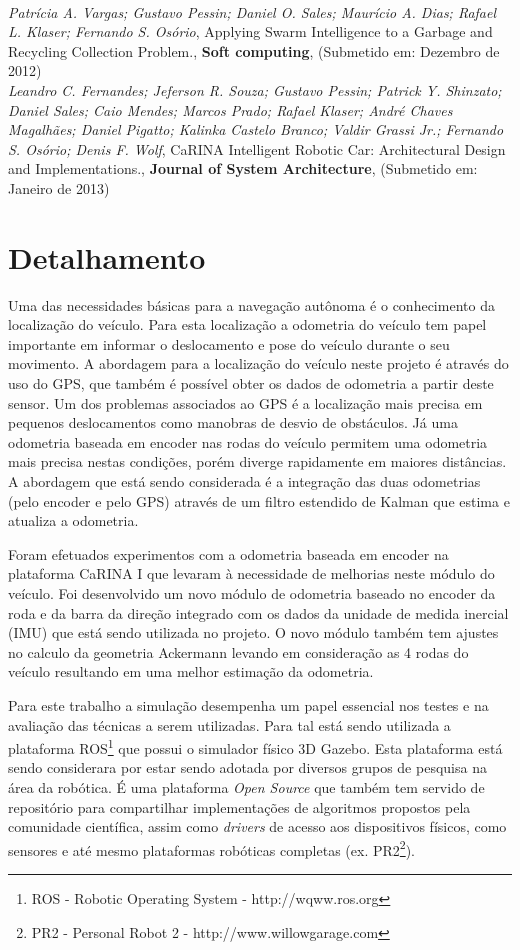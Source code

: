 \documentclass{article}
\newcommand{\foot}[1]{\footnote{	\fontfamily{cmss}\selectfont\footnotesize{#1}}}
\begin{document}
\\

\textit{Patrícia A. Vargas; Gustavo Pessin; Daniel O. Sales; Maurício A. Dias;
Rafael L. Klaser; Fernando S. Osório},
Applying Swarm Intelligence to a Garbage and Recycling Collection Problem.,
\textbf{Soft computing}, (Submetido em: Dezembro de 2012)
\\

\textit{Leandro C. Fernandes; Jeferson R. Souza; Gustavo Pessin; Patrick Y.
Shinzato; Daniel Sales; Caio Mendes; Marcos Prado; Rafael Klaser; André Chaves
Magalhães; Daniel Pigatto; Kalinka Castelo Branco; Valdir Grassi Jr.; Fernando
S. Osório; Denis F. Wolf},
CaRINA Intelligent Robotic Car:
Architectural Design and Implementations., \textbf{Journal of System
Architecture}, (Submetido em: Janeiro de 2013)




\section{Detalhamento}


Uma das necessidades básicas para a navegação autônoma é o conhecimento da
localização do veículo. Para esta localização a odometria do veículo tem papel
importante em informar o deslocamento e pose do veículo durante o seu movimento.
A abordagem para a localização do veículo neste projeto é através do uso do GPS,
que também é possível obter os dados de odometria a partir deste sensor. Um dos
problemas associados ao GPS é a localização mais precisa em pequenos
deslocamentos como manobras de desvio de obstáculos. Já uma odometria baseada em
encoder nas rodas do veículo permitem uma odometria mais precisa nestas
condições, porém diverge rapidamente em maiores distâncias. A abordagem que está
sendo considerada é a integração das duas odometrias (pelo encoder e pelo GPS)
através de um filtro estendido de Kalman que estima e atualiza a odometria.

Foram efetuados experimentos com a odometria baseada em encoder na plataforma
CaRINA I que levaram à necessidade de melhorias neste módulo do veículo. Foi
desenvolvido um novo módulo de odometria baseado no encoder da roda e da barra
da direção integrado com os dados da unidade de medida inercial (IMU) que está
sendo utilizada no projeto. O novo módulo também tem ajustes no calculo da
geometria Ackermann levando em consideração as 4 rodas do veículo resultando em
uma melhor estimação da odometria.


Para este trabalho a simulação desempenha um papel essencial nos testes e na
avaliação das técnicas a serem utilizadas. Para tal está sendo utilizada a
plataforma ROS\foot{ROS - Robotic Operating System - http://wqww.ros.org} que
possui o simulador físico 3D Gazebo. Esta plataforma está sendo considerara por
estar sendo adotada por diversos grupos de pesquisa na área da robótica. É uma
plataforma \textit{Open Source} que também tem servido de repositório para
compartilhar implementações de algoritmos propostos pela comunidade científica,
assim como \textit{drivers} de acesso aos dispositivos físicos, como sensores e
até mesmo plataformas robóticas completas (ex.
PR2\foot{PR2 - Personal Robot 2 - http://www.willowgarage.com}).
\end{document}
